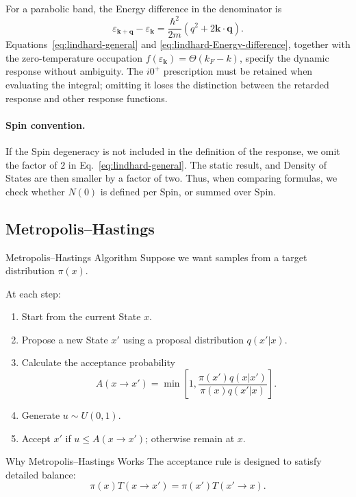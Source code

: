 \documentclass[a4paper, 10pt, onepage]{elegantbook}
\begin{document}
{For a parabolic band, the Energy difference in the denominator is
\begin{equation}
\varepsilon_{\mathbf{k+q}}-\varepsilon_{\mathbf k}
=
\frac{\hbar^2}{2m}\left(q^2+2\mathbf k\cdot\mathbf q\right).
\label{eq:lindhard-Energy-difference}
\end{equation}
Equations~\eqref{eq:lindhard-general} and
\eqref{eq:lindhard-Energy-difference}, together with the zero-temperature
occupation \(f(\varepsilon_{\mathbf k})=\Theta(k_F-k)\), specify the
dynamic response without ambiguity. The \(i0^+\) prescription must be
retained when evaluating the integral; omitting it loses the distinction
between the retarded response and other response functions.

\paragraph{Spin convention.}
If the Spin degeneracy is not included in the definition of the response,
we omit the factor of \(2\) in Eq.~\eqref{eq:lindhard-general}. The static
result, and Density of States are then smaller by a factor of two. Thus,
when comparing formulas, we check whether \(N(0)\) is defined per Spin, or
summed over Spin.


\subsection{Metropolis--Hastings}

\begin{frame}{Metropolis--Hastings Algorithm}
  Suppose we want samples from a target distribution \(\pi(x)\).

  At each step:
  \begin{enumerate}
    \item Start from the current State \(x\).
    \item Propose a new State \(x'\) using a proposal distribution \(q(x'|x)\).
    \item Calculate the acceptance probability
    \[
      A(x\to x')
      =
      \min\left[
        1,
        \frac{\pi(x')q(x|x')}
             {\pi(x)q(x'|x)}
      \right].
    \]
    \item Generate \(u\sim U(0,1)\).
    \item Accept \(x'\) if \(u\le A(x\to x')\); otherwise remain at \(x\).
  \end{enumerate}
\end{frame}

\begin{frame}{Why Metropolis--Hastings Works}
  The acceptance rule is designed to satisfy detailed balance:
  \[
    \pi(x)T(x\to x')
    =
    \pi(x')T(x'\to x).
  \]


\end{frame}}
\end{document}
